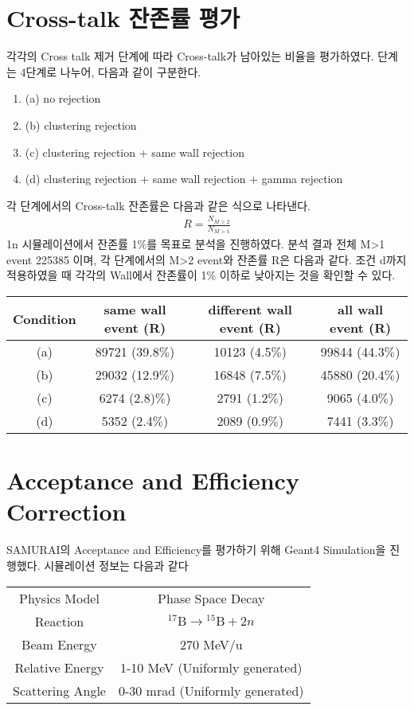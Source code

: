 \section{Cross-talk 잔존률 평가}
각각의 Cross talk 제거 단계에 따라 Cross-talk가 남아있는 비율을 평가하였다. 단계는 4단계로 나누어, 다음과 같이 구분한다. 
\begin{enumerate}
    \item (a) no rejection
    \item (b) clustering rejection
    \item (c) clustering rejection + same wall rejection
    \item (d) clustering rejection + same wall rejection + gamma rejection
\end{enumerate}
각 단계에서의 Cross-talk 잔존률은 다음과 같은 식으로 나타낸다. \
\begin{align}
    R = \frac{N_{M>2}}{N_{M>1}}
\end{align}
1n 시뮬레이션에서 잔존률 1$\%$를 목표로 분석을 진행하였다. 분석 결과 전체 M>1 event 225385 이며, 각 단계에서의 M>2 event와 잔존률 R은 다음과 같다. 조건 d까지 적용하였을 때 각각의 Wall에서 잔존률이 1$\%$ 이하로 낮아지는 것을 확인할 수 있다.
\begin{center}
    \begin{tabular}[h]{c|c|c|c}
        \hline
        Condition & same wall event (R) & different wall event (R) & all wall event (R)\\
        \hline
        (a) & 89721 (39.8$\%$) & 10123 (4.5$\%$) & 99844 (44.3$\%$) \\
        (b) & 29032 (12.9$\%$) & 16848 (7.5$\%$) & 45880 (20.4$\%$)\\
        (c) & 6274 (2.8)$\%$)   & 2791 (1.2$\%$)& 9065 (4.0$\%$)\\
        (d) & 5352 (2.4$\%$)& 2089 (0.9$\%$)& 7441 (3.3$\%$)\\
        \hline
    \end{tabular}
\end{center}

\section{Acceptance and Efficiency Correction}
SAMURAI의 Acceptance and Efficiency를 평가하기 위해 Geant4 Simulation을 진행했다. 시뮬레이션 정보는 다음과 같다 
\begin{center}
    \begin{tabular}[h]{c|c}
        \hline
        Physics Model & Phase Space Decay \\
        Reaction & ${}^{17}\text{B} \to {}^{15}\text{B} + 2n$\\
        Beam Energy & 270 MeV/u\\
        Relative Energy & 1-10 MeV (Uniformly generated)\\
        Scattering Angle & 0-30 mrad (Uniformly generated)\\
        \hline
    \end{tabular}
\end{center}

